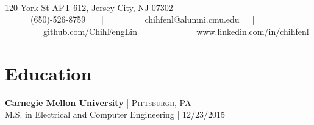 \documentclass[10pt]{article} %
\begin{document}
\color{text1} %


\par{\\[0.5\baselineskip] %

{ 120 York St APT 612, Jersey City, NJ 07302}\\

{\ \ \ \faMobilePhone \ \ \  (650)-526-8759 \ \ \ | \ \ \  
\  \ \ \faEnvelope \ \ \ chihfenl@alumni.cmu.edu\ \ \ | \ \ \   
\  \ \ \faGithub \ \ \ github.com/ChihFengLin \ \ \ | \ \ \  
\  \ \ \faLinkedin \ \ \ www.linkedin.com/in/chihfenl }
	

\begin{minipage}[t]{0.5\textwidth} %
\vspace{0pt} %
	


\section{Education} 




\textbf{Carnegie Mellon University} {\hfill\footnotesize\textsc{| Pittsburgh, PA}}\\
M.S. in Electrical and Computer Engineering {\hfill\footnotesize\textsc{| 12/23/2015}}
	 



\end{minipage}}
\end{document}
